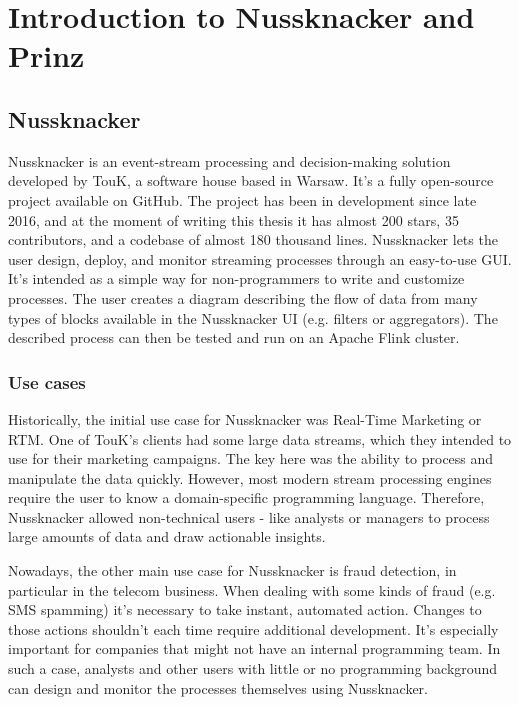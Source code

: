 \chapter{Introduction to Nussknacker and Prinz}
\label{chap:intro-nussknacker-prinz}

\section{Nussknacker}

Nussknacker is an event-stream processing and decision-making solution developed by TouK, a software house based in Warsaw.
It's a fully open-source project available on GitHub.
The project has been in development since late 2016, and at the moment of writing this thesis it has almost 200 stars, 35 contributors, and a codebase of almost 180 thousand lines.
Nussknacker lets the user design, deploy, and monitor streaming processes through an easy-to-use GUI.
It's intended as a simple way for non-programmers to write and customize processes.
The user creates a diagram describing the flow of data from many types of blocks available in the Nussknacker UI (e.g. filters or aggregators).
The described process can then be tested and run on an Apache Flink cluster.

\subsection{Use cases}

Historically, the initial use case for Nussknacker was Real-Time Marketing or RTM.
One of TouK's clients had some large data streams, which they intended to use for their marketing campaigns.
The key here was the ability to process and manipulate the data quickly.
However, most modern stream processing engines require the user to know a domain-specific programming language.
Therefore, Nussknacker allowed non-technical users - like analysts or managers to process large amounts of data and draw actionable insights.

Nowadays, the other main use case for Nussknacker is fraud detection, in particular in the telecom business.
When dealing with some kinds of fraud (e.g. SMS spamming) it's necessary to take instant, automated action.
Changes to those actions shouldn't each time require additional development.
It's especially important for companies that might not have an internal programming team.
In such a case, analysts and other users with little or no programming background can design and monitor the processes themselves using Nussknacker.

